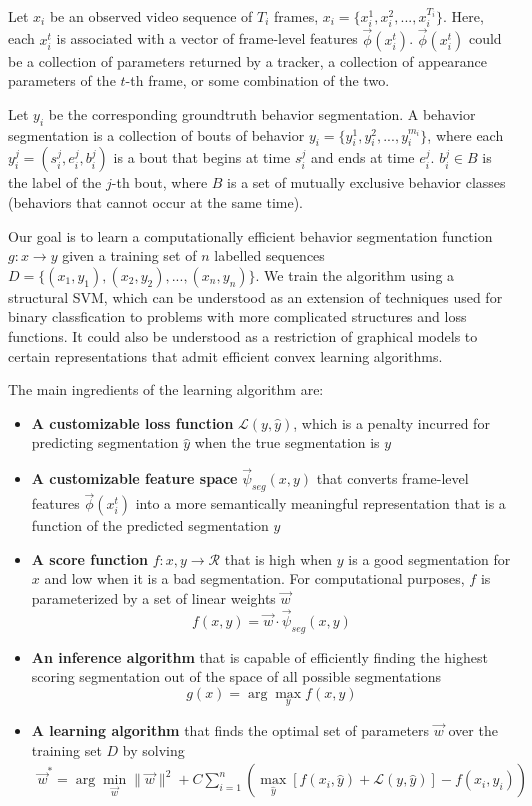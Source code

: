 \documentclass[10pt, onecolumn]{article}
\newcommand{\1}{\textbf{1}}
\begin{document}
Let $x_i$ be an observed video sequence of $T_i$ frames, $x_i=\{x_i^1,x_i^2,...,x_i^{T_i}\}$.  Here, each $x_i^t$ is associated with a vector of frame-level features $\vec{\phi}(x_i^t)$.  $\vec{\phi}(x_i^t)$ could be a collection of parameters returned by a tracker, a collection of appearance parameters of the $t$-th frame, or some combination of the two.

Let $y_i$ be the corresponding groundtruth behavior segmentation.  A behavior segmentation is a collection of bouts of behavior $y_i=\{y_i^1,y_i^2,...,y_i^{m_i}\}$, where each $y_i^j=(s_i^j,e_i^j,b_i^j)$ is a bout that begins at time $s_i^j$ and ends at time $e_i^j$.  $b_i^j \in B$ is the label of the $j$-th bout, where $B$ is a set of mutually exclusive behavior classes (behaviors that cannot occur at the same time).

Our goal is to learn a computationally efficient behavior segmentation function $g:x \to y$ given a training set of $n$ labelled sequences $D=\{(x_1,y_1),(x_2,y_2),...,(x_n,y_n)\}$.  We train the algorithm using a structural SVM, which can be understood as an extension of techniques used for binary classfication to problems with more complicated structures and loss functions.  It could also be understood as a restriction of graphical models to certain representations that admit efficient convex learning algorithms.

The main ingredients of the learning algorithm are:
\begin{itemize} 
 \item \textbf{A customizable loss function} $\mathcal{L}(y,\hat{y})$, which is a penalty incurred for predicting segmentation $\hat{y}$ when the true segmentation is $y$
 \item \textbf{A customizable feature space} $\vec{\psi}_{seg}(x,y)$ that converts frame-level features $\vec{\phi}(x_i^t)$ into a more semantically meaningful representation that is a function of the predicted segmentation $y$
 \item \textbf{A score function} $f:x,y \to \mathcal{R}$ that is high when $y$ is a good segmentation for $x$ and low when it is a bad segmentation.  For computational purposes, $f$ is parameterized by a set of linear weights $\vec{w}$
\begin{equation}
 f(x,y) = \vec{w} \cdot \vec{\psi}_{seg}(x,y)
\end{equation}
 \item \textbf{An inference algorithm} that is capable of efficiently finding the highest scoring segmentation out of the space of all possible segmentations
\begin{equation}
 g(x) = \arg\max_{y} f(x,y)
\end{equation}
 \item \textbf{A learning algorithm} that finds the optimal set of parameters $\vec{w}$ over the training set $D$ by solving
\begin{eqnarray}
\vec{w}^* = \arg\min_{\vec{w}} \|\vec{w}\|^2 + C \sum_{i=1}^n \left( \max_{\hat{y}} \left[ f(x_i,\hat{y}) + \mathcal{L}(y,\hat{y}) \right] - f(x_i,y_i) \right)
\label{eq:objective}
\end{eqnarray}
\end{itemize}
\end{document}
